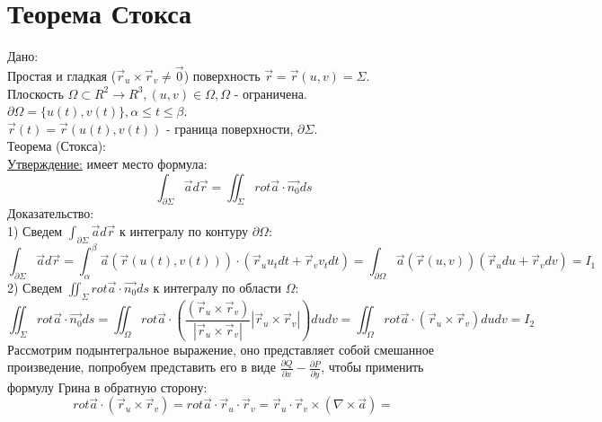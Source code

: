 \documentclass[12pt]{article}
\begin{document}
\section{Теорема Стокса}
Дано:\\
Простая и гладкая ($\overrightarrow{r}_u \times \overrightarrow{r}_v \neq \overrightarrow{0}$) поверхность $\overrightarrow{r} = \overrightarrow{r} (u,v) = \Sigma$.\\
Плоскость $\Omega \subset R^2 \to R^3, (u,v) \in \Omega, \Omega$ - ограничена.\\
$\partial \Omega = \{ u(t), v(t) \}, \alpha \leq t \leq \beta$.\\
$\overrightarrow{r}(t) = \overrightarrow{r}(u(t),v(t))$ - граница поверхности, $\partial \Sigma$.\\
Теорема (Стокса):\\
\uline{Утверждение:} имеет место формула:\\
$$\int_{\partial \Sigma} \overrightarrow{a} d \overrightarrow{r} = \iint_{\Sigma} rot \overrightarrow{a} \cdot \overrightarrow{n_0} ds$$
Доказательство:\\
1) Сведем $\int_{\partial \Sigma} \overrightarrow{a} d \overrightarrow{r}$ к интегралу по контуру $\partial \Omega$:\\
$$\int_{\partial \Sigma} \overrightarrow{a} d \overrightarrow{r} = \int_{\alpha}^{\beta} \overrightarrow{a} (\overrightarrow{r}(u(t),v(t))) \cdot (\overrightarrow{r}_u u_t dt + \overrightarrow{r}_v v_t dt) = \int_{\partial \Omega} \overrightarrow{a} (\overrightarrow{r}(u,v)) (\overrightarrow{r}_u du + \overrightarrow{r}_v dv) = I_1$$
2) Сведем $\iint_{\Sigma} rot \overrightarrow{a} \cdot \overrightarrow{n_0} ds$ к интегралу по области $\Omega$:\\
$$\iint_{\Sigma} rot \overrightarrow{a} \cdot \overrightarrow{n_0} ds = \iint_{\Omega} rot \overrightarrow{a} \cdot (\frac{(\overrightarrow{r}_u \times \overrightarrow{r}_v)}{|\overrightarrow{r}_u \times \overrightarrow{r}_v|} |\overrightarrow{r}_u \times \overrightarrow{r}_v|) du dv = \iint_{\Omega} rot \overrightarrow{a} \cdot (\overrightarrow{r}_u \times \overrightarrow{r}_v) du dv = I_2$$
Рассмотрим подынтегральное выражение, оно представляет собой смешанное произведение, попробуем представить его в виде $\frac{\partial Q}{\partial x} - \frac{\partial P}{\partial y}$, чтобы применить формулу Грина в обратную сторону:\\
$$rot \overrightarrow{a} \cdot (\overrightarrow{r}_u \times \overrightarrow{r}_v) = rot \overrightarrow{a} \cdot \overrightarrow{r}_u \cdot \overrightarrow{r}_v = \overrightarrow{r}_u \cdot \overrightarrow{r}_v \times (\nabla \times \overrightarrow{a}) =$$
\end{document}
